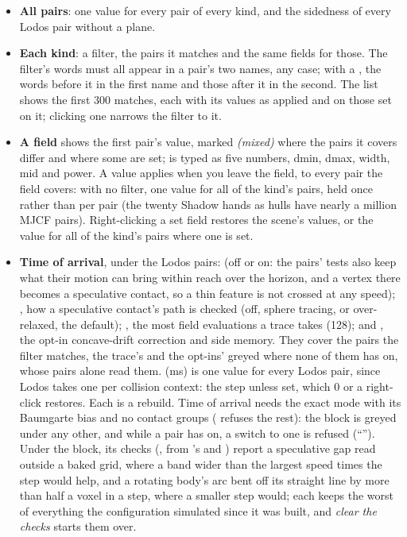 \begin{itemize}
\item \textbf{All pairs}: one value for every pair of every kind, and the sidedness of every Lodos pair without a plane.
\item \textbf{Each kind}: a filter, the pairs it matches and the same fields for those. The filter's words must all appear in a pair's two names, any case; with a \code{/}, the words before it in the first name and those after it in the second. The list shows the first 300 matches, each with its values as applied and \code{*} on those set on it; clicking one narrows the filter to it.
\item \textbf{A field} shows the first pair's value, marked \emph{(mixed)} where the pairs it covers differ and \code{*} where some are set;  is typed as five numbers, dmin, dmax, width, mid and power. A value applies when you leave the field, to every pair the field covers: with no filter, one value for all of the kind's pairs, held once rather than per pair (the twenty Shadow hands as hulls have nearly a million MJCF pairs). Right-clicking a set field restores the scene's values, or the value for all of the kind's pairs where one is set.
\item \textbf{Time of arrival}, under the Lodos pairs:  (off or on: the pairs' tests also keep what their motion can bring within reach over the horizon, and a vertex there becomes a speculative contact, so a thin feature is not crossed at any speed); , how a speculative contact's path is checked (off, sphere tracing, or over-relaxed, the default); , the most field evaluations a trace takes (128);  and , the opt-in concave-drift correction and side memory. They cover the pairs the filter matches, the trace's and the opt-ins' greyed where none of them has  on, whose pairs alone read them.  (ms) is one value for every Lodos pair, since Lodos takes one per collision context: the step unless set, which 0 or a right-click restores. Each is a rebuild. Time of arrival needs the exact mode with its Baumgarte bias and no contact groups ( refuses the rest): the block is greyed under any other, and while a pair has  on, a switch to one is refused (``''). Under the block, its checks (, from 's  and ) report a speculative gap read outside a baked grid, where a band wider than the largest speed times the step would help, and a rotating body's arc bent off its straight line by more than half a voxel in a step, where a smaller step would; each keeps the worst of everything the configuration simulated since it was built, and \emph{clear the checks} starts them over.
\end{itemize}

